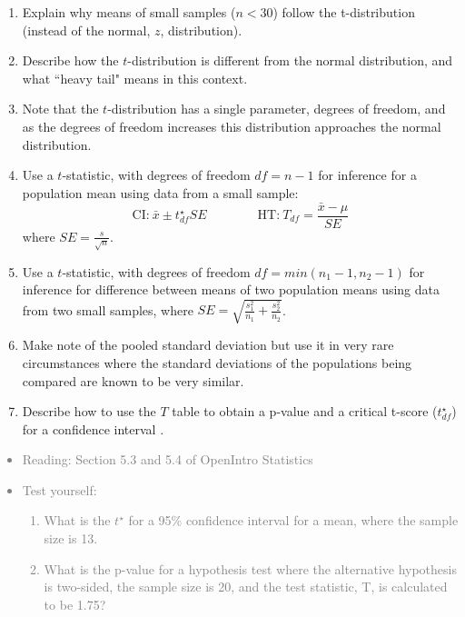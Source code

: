 \documentclass[11pt]{article}
\newcommand{\gray}[1]{\textcolor{gray}{#1}}
\begin{document}
\begin{enumerate}[resume]
\renewcommand\labelenumi{\textcolor{light}{\textbf{LO \theenumi.}}}

\item Explain why means of small samples ($n < 30$) follow the t-distribution (instead of the normal, $z$, distribution).

\item Describe how the $t$-distribution is different from the normal distribution, and what ``heavy tail" means in this context.

\item Note that the $t$-distribution has a single parameter, degrees of freedom, and as the degrees of freedom increases this distribution approaches the normal distribution.

\item Use a $t$-statistic, with degrees of freedom $df = n - 1$ for inference for a population mean using data from a small sample:
\[ \text{CI:}~\bar{x} \pm t^\star_{df} SE \qquad \qquad \text{HT:}~T_{df} = \frac{\bar{x} - \mu}{SE} \]
where $SE = \frac{s}{\sqrt{n}}$.

\item Use a $t$-statistic, with degrees of freedom $df = min(n_1 - 1, n_2 - 1)$ for inference for difference between means of two population means using data from two small samples, where $SE = \sqrt{\frac{s_1^2}{n_1} + \frac{s_2^2}{n_2}}$.

\item Make note of the pooled standard deviation but use it in very rare circumstances where the standard deviations of the populations being compared are known to be very similar.

\item Describe how to use the $T$ table to obtain a p-value and a critical t-score ($t^\star_{df}$) for a confidence interval .

\end{enumerate}

\gray{
{\it
\vspace{-0.55cm}
\begin{itemize}
\renewcommand{\labelitemi}{{\textcolor{dark}{$\ast$}}}
\item Reading: Section 5.3 and 5.4 of OpenIntro Statistics
\item Test yourself:
\begin{enumerate}
\item What is the $t^\star$ for a 95\% confidence interval for a mean, where the sample size is 13.
\item What is the p-value for a hypothesis test where the alternative hypothesis is two-sided, the sample size is 20, and the test statistic, T, is calculated to be 1.75?
\end{enumerate}
\end{itemize}
}}
\end{document}
